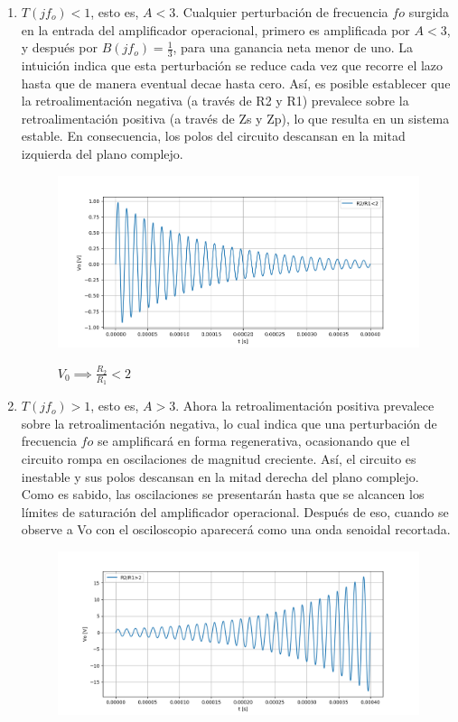 \begin{enumerate}
\item  	$T(jf_o) < 1$, esto es, $A < 3 $. Cualquier perturbación de frecuencia $fo$ surgida en la
entrada del amplificador operacional, primero es amplificada por $A < 3$, y después por $B(jf_o) =\frac{1}{3}$,
para una ganancia neta menor de uno. La intuición indica que esta perturbación se reduce cada vez que recorre el lazo hasta que de manera eventual decae hasta cero. Así, es
posible establecer que la retroalimentación negativa (a través de R2 y R1) prevalece 
sobre la retroalimentación positiva (a través de Zs y Zp), lo que resulta en un sistema estable. En consecuencia, los polos del circuito descansan en la mitad izquierda del
plano complejo. 
\begin{figure}[H]
	\centering
	\includegraphics[width=\textwidth]{Imagenes-Ej1/r1r2m.png}
	\label{fig:r1r2m}
	\caption{$V_0 \implies \frac{R_2}{R_1}<2$}
\end{figure}
\item 	 $T(jf_o) > 1$, esto es, $A> 3$. Ahora la retroalimentación positiva prevalece sobre la
retroalimentación negativa, lo cual indica que una perturbación de frecuencia $fo$ se amplificará en forma regenerativa, ocasionando que el circuito rompa en oscilaciones de
magnitud creciente. Así, el circuito es inestable y sus polos descansan en la mitad derecha del plano complejo. Como es sabido, las oscilaciones se presentarán hasta que se
alcancen los límites de saturación del amplificador operacional. Después de eso, cuando se observe a Vo
con el osciloscopio aparecerá como una onda senoidal recortada.
\begin{figure}[H]
	\centering
	\includegraphics[width=\textwidth]{Imagenes-Ej1/r1r2g.png}

\end{figure}
\end{enumerate}
